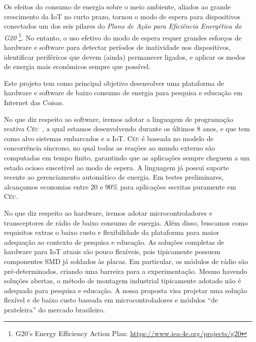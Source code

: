 \documentclass[titlepage,12pt]{article}
\newcommand{\CEU}{\textsc{C\'{e}u}\xspace}
\begin{document}
Os efeitos do consumo de energia sobre o meio ambiente, aliados ao grande
crescimento da IoT no curto prazo, tornou o modo de espera para dispositivos
conectados um dos seis pilares do \emph{Plano de Ação para Eficiência
Energética do G20}%
\footnote{G20's Energy Efficiency Action Plan: \url{https://www.iea-4e.org/projects/g20}}.
No entanto, o uso efetivo do modo de espera requer grandes esforços de hardware
e software para detectar períodos de inatividade nos dispositivos, identificar
periféricos que devem (ainda) permanecer ligados, e aplicar os modos de energia
mais econômicos sempre que possível.

Este projeto tem como principal objetivo desenvolver uma plataforma de hardware
e software de baixo consumo de energia para pesquisa e educação em Internet das
Coisas.

No que diz respeito ao software, iremos adotar a linguagem de programação
reativa \CEU~\cite{ceu.sensys13}, a qual estamos desenvolvendo durante os
últimos 8 anos, e que tem como alvo sistemas embarcados e a IoT.
%
\CEU é baseada no modelo de concorrência síncrono, no qual todas as reações ao
mundo externo são computadas em tempo finito, garantindo que as aplicações
sempre cheguem a um estado ocioso suscetível ao modo de espera.
%
A linguagem já possui suporte recente ao gerenciamento automático de energia.
Em testes preliminares, alcançamos economias entre 20 e 90\% para aplicações
escritas puramente em \CEU.

No que diz respeito ao hardware, iremos adotar microcontroladores e
transceptores de rádio de baixo consumo de energia.
Além disso, buscamos como requisitos extras o baixo custo e flexibilidade da
plataforma para maior adequação ao contexto de pesquisa e educação.
%
As soluções completas de hardware para IoT atuais são pouco flexíveis, pois
tipicamente possuem componentes SMD já soldados às placas.
Em particular, os módulos de rádio são pré-determinados, criando uma barreira
para a experimentação.
Mesmo havendo soluções abertas, o método de montagem industrial tipicamente
adotado não é adequado para pesquisa e educação.
%
A nossa proposta visa projetar uma solução flexível e de baixo custo baseada em
microcontroladores e módulos ``de prateleira'' do mercado brasileiro.

\end{document}
